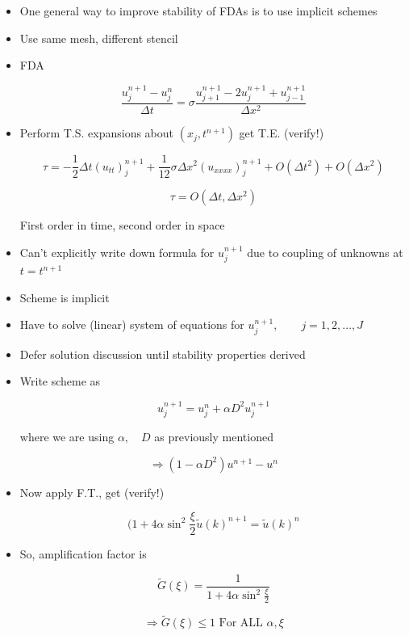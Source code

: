 \begin{itemize}
    \item One general way to improve stability of FDAs is to use implicit schemes
    \item Use same mesh, different stencil

    \item FDA

    \[ \frac{u_j^{n+1}-u_j^{n}}{\Delta t} = \sigma \frac{u_{j+1}^{n+1}-2u_j^{n+1}+u_{j-1}^{n+1}}{\Delta x^2}\]

    \item Perform T.S. expansions about $(x_j, t^{n+1})$ get T.E. (verify!)

    \[ \tau = - \frac{1}{2} \Delta t(u_{tt})^{n+1}_{j} + \frac{1}{12} \sigma \Delta x^2 (u_{xxxx})_j^{n+1} + O(\Delta t^2)+ O(\Delta x^2)\]

    \[ \tau = O(\Delta t, \Delta x^2)\]

    First order in time, second order in space

    \item Can't explicitly write down formula for $u_j^{n+1}$ due to coupling of unknowns at $t=t^{n+1}$

    \item Scheme is implicit 

    \item Have to solve (linear) system of equations for $u_j^{n+1}, \qquad j = 1,2,\ldots , J$

    \item Defer solution discussion until stability properties derived

    \item Write scheme as

    \[ u_j^{n+1} = u_j^n + \alpha D^2 u_j^{n+1}\]

    where we are using $\alpha, \quad D$ as previously mentioned

    \[ \Rightarrow (1-\alpha D^2) u^{n+1} - u^n\]

    \item Now apply F.T., get (verify!)

    \[ (1+4\alpha \sin^2 \frac{\xi}{2} \tilde{u}(k)^{n+1} = \tilde{u}(k)^n\]

    \item So, amplification factor is 

    \[ \tilde{G}(\xi) = \frac{1}{1+4\alpha \sin^2\frac{\xi}{2}}\]

    \[ \Rightarrow \tilde{G}(\xi) \le 1 \text{ For ALL } \alpha, \xi\]


\end{itemize}
